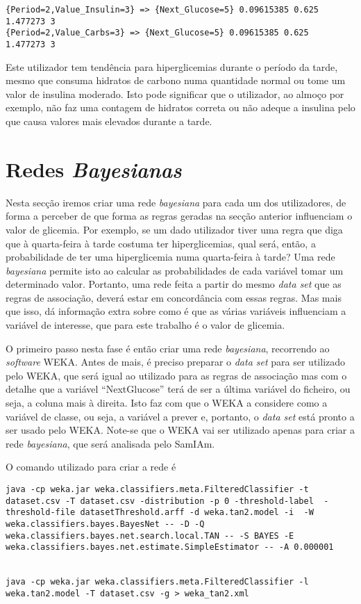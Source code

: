 \begin{lstlisting}
{Period=2,Value_Insulin=3} => {Next_Glucose=5} 0.09615385 0.625      1.477273 3    
{Period=2,Value_Carbs=3} => {Next_Glucose=5} 0.09615385 0.625      1.477273 3    
\end{lstlisting}

Este utilizador tem tendência para hiperglicemias durante o período da tarde, mesmo que consuma hidratos de carbono numa quantidade normal ou tome um valor de insulina moderado. Isto pode significar que o utilizador, ao almoço por exemplo, não faz uma contagem de hidratos correta ou não adeque a insulina pelo que causa valores mais elevados durante a tarde. 

\section{Redes \textit{Bayesianas}}

Nesta secção iremos criar uma rede \textit{bayesiana} para cada um dos utilizadores, de forma a perceber de que forma as regras geradas na secção anterior influenciam o valor de glicemia. Por exemplo, se um dado utilizador tiver uma regra que diga que à quarta-feira à tarde costuma ter hiperglicemias, qual será, então, a probabilidade de ter uma hiperglicemia numa quarta-feira à tarde? Uma rede \textit{bayesiana} permite isto ao calcular as probabilidades de cada variável tomar um determinado valor. Portanto, uma rede feita a partir do mesmo \textit{data set} que as regras de associação, deverá estar em concordância com essas regras. Mas mais que isso, dá informação extra sobre como é que as várias variáveis influenciam a variável de interesse, que para este trabalho é o valor de glicemia.

O primeiro passo nesta fase é então criar uma rede \textit{bayesiana}, recorrendo ao \textit{software} WEKA. Antes de mais, é preciso preparar o \textit{data set} para ser utilizado pelo WEKA, que será igual ao utilizado para as regras de associação mas com o detalhe que a variável ``Next\textunderscore Glucose'' terá de ser a última variável do ficheiro, ou seja, a coluna mais à direita. Isto faz com que o WEKA a considere como a variável de classe, ou seja, a variável a prever e, portanto, o \textit{data set} está pronto a ser usado pelo WEKA. Note-se que o WEKA vai ser utilizado apenas para criar a rede \textit{bayesiana}, que será analisada pelo SamIAm.

O comando utilizado para criar a rede é

\begin{lstlisting}
java -cp weka.jar weka.classifiers.meta.FilteredClassifier -t dataset.csv -T dataset.csv -distribution -p 0 -threshold-label  -threshold-file datasetThreshold.arff -d weka.tan2.model -i  -W weka.classifiers.bayes.BayesNet -- -D -Q weka.classifiers.bayes.net.search.local.TAN -- -S BAYES -E weka.classifiers.bayes.net.estimate.SimpleEstimator -- -A 0.000001 


java -cp weka.jar weka.classifiers.meta.FilteredClassifier -l weka.tan2.model -T dataset.csv -g > weka_tan2.xml

\end{lstlisting}

